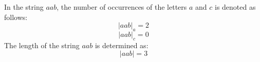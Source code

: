 \begin{example}
    In the string $aab$, the number of occurrences of the letters $a$ and $c$ is denoted as follows:
    \[{\left\lvert aab \right\rvert}_a = 2\]
    \[{\left\lvert aab \right\rvert}_c = 0\]
    The length of the string $aab$ is determined as:
    \[\left\lvert aab \right\rvert = 3\]
\end{example}